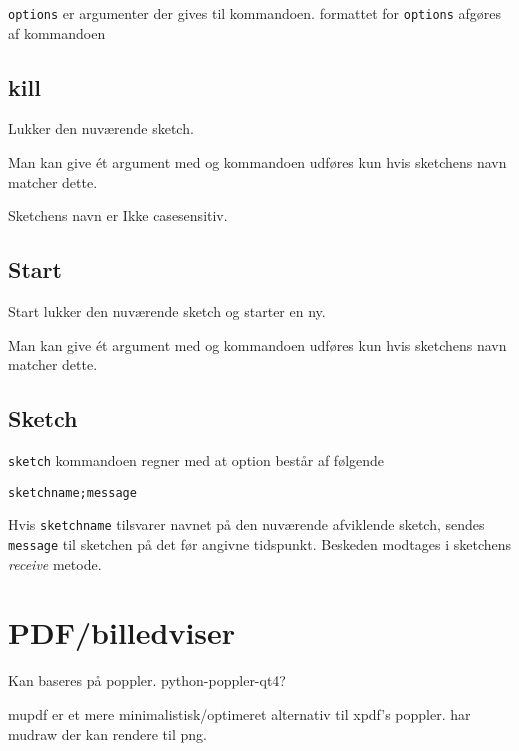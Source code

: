 \documentclass[10pt,a4paper,danish]{article}
\begin{document}
\texttt{options} er argumenter der gives til kommandoen.
formattet for \texttt{options} afgøres af kommandoen

\subsection{kill}
Lukker den nuværende sketch.

Man kan give ét argument med og kommandoen udføres kun hvis sketchens navn
matcher dette.

Sketchens navn er Ikke casesensitiv.

\subsection{Start}
Start lukker den nuværende sketch og starter en ny.

Man kan give ét argument med og kommandoen udføres kun hvis sketchens navn
matcher dette.

\subsection{Sketch}
\texttt{sketch} kommandoen regner med at option består af følgende
\begin{verbatim}
sketchname;message
\end{verbatim}

Hvis \texttt{sketchname} tilsvarer navnet på den nuværende afviklende sketch,
sendes \texttt{message} til sketchen på det før angivne tidspunkt.
Beskeden modtages i sketchens \textit{receive} metode.

\section{PDF/billedviser}
Kan baseres på poppler.
python-poppler-qt4?

mupdf er et mere minimalistisk/optimeret alternativ til xpdf's poppler.
har mudraw der kan rendere til png.
\end{document}
